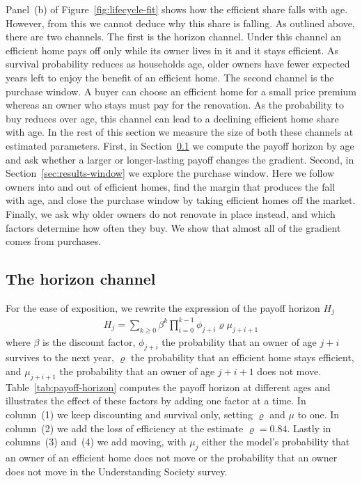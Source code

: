  Panel~(b) of Figure~\ref{fig:lifecycle-fit} shows how the efficient
share falls with age. However, from this we cannot deduce why this share is falling. As outlined above, there are two channels. The first
is the  horizon channel. Under this channel an efficient home pays off only while its owner lives
in it and it stays efficient. As survival probability reduces as households age, older owners have  fewer expected years left to enjoy the benefit of  an efficient home. The second  channel is the purchase window. A  buyer can choose an
efficient home for a small price premium whereas an owner who stays must pay
for the renovation. As the probability to buy reduces over age, this channel can lead to a declining efficient home share with age. In  the rest of
this section we measure the size of both these channels at estimated parameters. First, in  Section~\ref{sec:results-horizon}
we compute the payoff horizon by age and ask whether a larger or
longer-lasting payoff changes the gradient. Second, in Section~\ref{sec:results-window} we explore the purchase window. Here we follow owners into and out of efficient homes,
find the margin that produces the fall with age, and close the purchase window by
taking efficient homes off the market. Finally, we ask why older owners do not
renovate in place instead, and which factors determine how often they buy. We show that  almost all of the gradient comes from purchases. 


\subsection{\texorpdfstring{The horizon channel}{The horizon channel}}\label{sec:results-horizon}
  For the ease of exposition, we rewrite the expression of the payoff horizon $H_j$
\begin{align*}
  H_j =\sum_{k\geq 0} \beta^k \prod_{i=0}^{k-1} \phi_{j+i} \varrho\mu_{j+i+1}
\end{align*}
where $\beta$ is the discount factor, $\phi_{j+i}$ the probability that an
owner of age $j+i$ survives to the next year, $\varrho$ the probability that
an efficient home stays efficient, and $\mu_{j+i+1}$ the probability that an
owner of age $j+i+1$ does not move. Table~\ref{tab:payoff-horizon} computes the payoff horizon at different ages and illustrates the effect of these factors by adding one factor at a time. In column~(1) we keep discounting and survival only, setting $\varrho$ and
$\mu$ to one. In  column~(2) we add the loss of efficiency at the estimate
$\varrho=0.84$. Lastly in columns~(3) and~(4) we add moving, with $\mu_j$ either the model's
probability that an owner of an efficient home does not move or the
probability that an owner does not move in the Understanding Society survey.

